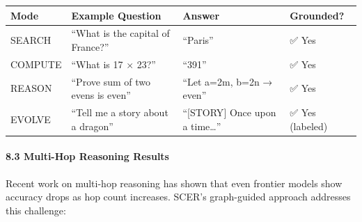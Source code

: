 \documentclass[
  11pt,
  a4paper,
]{article}
\begin{document}
\begin{longtable}[]{@{}
  >{\raggedright\arraybackslash}p{}
  >{\raggedright\arraybackslash}p{}
  >{\raggedright\arraybackslash}p{}
  >{\raggedright\arraybackslash}p{}@{}}
\toprule\noalign{}
\begin{minipage}[b]{\linewidth}\raggedright
Mode
\end{minipage} & \begin{minipage}[b]{\linewidth}\raggedright
Example Question
\end{minipage} & \begin{minipage}[b]{\linewidth}\raggedright
Answer
\end{minipage} & \begin{minipage}[b]{\linewidth}\raggedright
Grounded?
\end{minipage} \\
\midrule\noalign{}
\endhead
\bottomrule\noalign{}
\endlastfoot
SEARCH & ``What is the capital of France?'' & ``Paris'' & ✅ Yes \\
COMPUTE & ``What is 17 × 23?'' & ``391'' & ✅ Yes \\
REASON & ``Prove sum of two evens is even'' & ``Let a=2m, b=2n → even''
& ✅ Yes \\
EVOLVE & ``Tell me a story about a dragon'' & ``{[}STORY{]} Once upon a
time\ldots{}'' & ✅ Yes (labeled) \\
\end{longtable}

\paragraph{8.3 Multi-Hop Reasoning
Results}\label{multi-hop-reasoning-results}

Recent work on multi-hop reasoning has shown that even frontier models
show accuracy drops as hop count increases. SCER's graph-guided approach
addresses this challenge:
\end{document}
